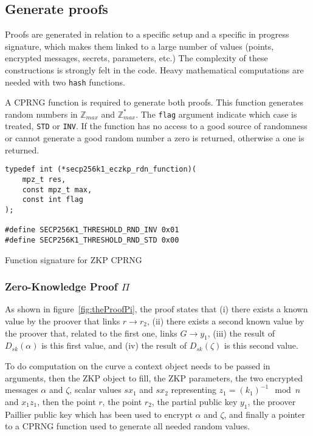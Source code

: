 \subsection{Generate proofs}

Proofs are generated in relation to a specific setup and a specific in progress
signature, which makes them linked to a large number of values (points,
encrypted messages, secrets, parameters, etc.) The complexity of these
constructions is strongly felt in the code. Heavy mathematical computations are
needed with two \texttt{hash} functions.

A CPRNG function is required to generate both proofs. This function generates
random numbers in $\mathbb{Z}_{max}$ and $\mathbb{Z}_{max}^*$. The \texttt{flag}
argument indicate which case is treated, \texttt{STD} or \texttt{INV}. If the
function has no access to a good source of randomness or cannot generate a good
random number a zero is returned, otherwise a one is returned.

\begin{listing}
  \begin{verbatim}
typedef int (*secp256k1_eczkp_rdn_function)(
    mpz_t res,
    const mpz_t max,
    const int flag
);

#define SECP256K1_THRESHOLD_RND_INV 0x01
#define SECP256K1_THRESHOLD_RND_STD 0x00
  \end{verbatim}
	\caption{Function signature for ZKP CPRNG}
	\label{lst:funcSigZKPCPRGN}
\end{listing}

\subsubsection{Zero-Knowledge Proof $\Pi$}

As shown in figure~\ref{fig:theProofPi}, the proof states that (i) there exists a
known value by the proover that links $r \rightarrow r_2$, (ii) there exists a
second known value by the proover that, related to the first one, links $G
\rightarrow y_1$, (iii) the result of $D_{sk}(\alpha)$ is this first value, and
(iv) the result of $D_{sk}(\zeta)$ is this second value.

To do computation on the curve a context object needs to be passed in arguments,
then the ZKP object to fill, the ZKP parameters, the two encrypted messages
$\alpha$ and $\zeta$, scalar values $sx_1$ and $sx_2$ representing $z_1 =
(k_1)^{-1} \mod n$ and $x_1z_1$, then the point $r$, the point $r_2$, the
partial public key $y_1$, the proover Paillier public key which has been used to
encrypt $\alpha$ and $\zeta$, and finally a pointer to a CPRNG function used to
generate all needed random values.


